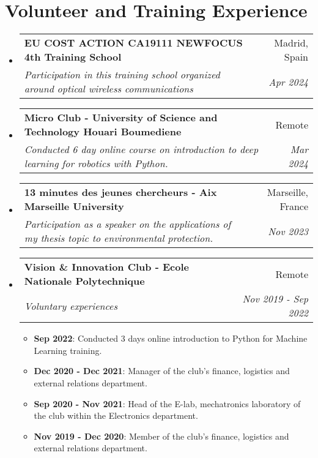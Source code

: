 \documentclass[a4paper,20pt]{article}
\makeatletter
\newcommand{\resumeItem}[2]{
  \item\small{
    \textbf{#1}{: #2 \vspace{-2pt}}
  }
}
\newcommand{\resumeSubheading}[4]{
  \vspace{-1pt}\item
    \begin{tabular*}{0.97\textwidth}{l@{\extracolsep{\fill}}r}
      \textbf{#1} & #2 \\
      \textit{#3} & \textit{#4} \\
    \end{tabular*}\vspace{-5pt}
}
\newcommand{\resumeSubHeadingListStart}{\begin{itemize}[leftmargin=*]}
\newcommand{\resumeSubHeadingListEnd}{\end{itemize}}
\newcommand{\resumeItemListStart}{\begin{itemize}}
\newcommand{\resumeItemListEnd}{\end{itemize}\vspace{-5pt}}
\makeatother
\begin{document}
\vspace{-5pt}
\section{Volunteer and Training Experience}
  \resumeSubHeadingListStart
    \resumeSubheading
    {EU COST ACTION CA19111 NEWFOCUS 4th Training School}{Madrid, Spain}
    {Participation in this training school organized around optical wireless communications}{Apr 2024}
    \vspace{5pt}
    \resumeSubheading
    {Micro Club - University of Science and Technology Houari Boumediene}{Remote}
    {Conducted 6 day online course on introduction to deep learning for robotics with Python.}{Mar 2024}
    \resumeSubheading
    {13 minutes des jeunes chercheurs - Aix Marseille University}{Marseille, France}
    {Participation as a speaker on the applications of my thesis topic to environmental protection.}{Nov 2023}
    \vspace{5pt}
	  \resumeSubheading
    {Vision \& Innovation Club - Ecole Nationale Polytechnique}{Remote}{Voluntary experiences}{Nov 2019 - Sep 2022}
    \resumeItemListStart
    \resumeItem{Sep 2022}
    {Conducted 3 days online introduction to Python for Machine Learning training.}
    \resumeItem{Dec 2020 - Dec 2021}
    {Manager of the club's finance, logistics and external relations department.}
    \resumeItem{Sep 2020 - Nov 2021}
    {Head of the E-lab, mechatronics laboratory of the club within the Electronics department.}
    \resumeItem{Nov 2019 - Dec 2020}
    {Member of the club's finance, logistics and external relations department.}
    \resumeItemListEnd
    \vspace{5pt}
  \resumeSubHeadingListEnd

\vspace{-5pt}
\end{document}
